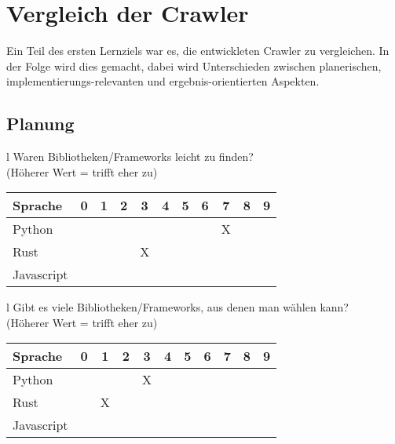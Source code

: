\chapter{Vergleich der Crawler}
Ein Teil des ersten Lernziels war es, die entwickleten Crawler zu vergleichen.
In der Folge wird dies gemacht, dabei wird Unterschieden zwischen
planerischen, implementierungs-relevanten und ergebnis-orientierten Aspekten.


\section{Planung}

\begin{tabular}{l}
	Waren Bibliotheken/Frameworks leicht zu finden? \\
	(Höherer Wert = trifft eher zu)                 \\
	\begin{tabular}{| l | c | c | c | c | c | c | c | c | c | c |}
		\hline
		Sprache    & 0 & 1 & 2 & 3 & 4 & 5 & 6 & 7 & 8 & 9 \\
		\hline
		Python     &   &   &   &   &   &   &   & X &   &   \\
		\hline
		Rust       &   &   &   & X &   &   &   &   &   &   \\
		\hline
		Javascript &   &   &   &   &   &   &   &   &   &   \\
		\hline
	\end{tabular}
\end{tabular}

\begin{tabular}{l}
	Gibt es viele Bibliotheken/Frameworks, aus denen man wählen kann? \\
	(Höherer Wert = trifft eher zu)                                   \\
	\begin{tabular}{| l | c | c | c | c | c | c | c | c | c | c |}
		\hline
		Sprache    & 0 & 1 & 2 & 3 & 4 & 5 & 6 & 7 & 8 & 9 \\
		\hline
		Python     &   &   &   & X &   &   &   &   &   &   \\
		\hline
		Rust       &   & X &   &   &   &   &   &   &   &   \\
		\hline
		Javascript &   &   &   &   &   &   &   &   &   &   \\
		\hline
	\end{tabular}
\end{tabular}

